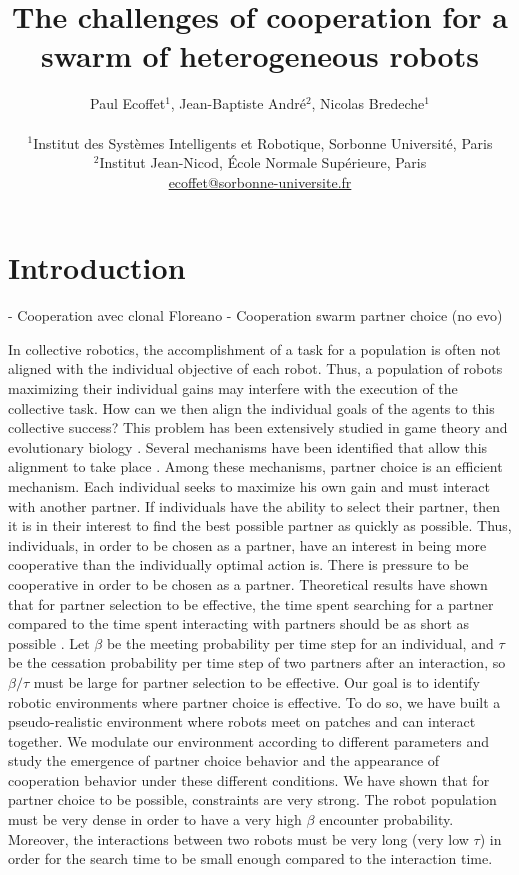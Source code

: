 \documentclass[letterpaper]{article}
\title{The challenges of cooperation for a swarm of heterogeneous robots}
\author{Paul Ecoffet$^1$, Jean-Baptiste André$^2$, Nicolas Bredeche$^1$ \\
\mbox{}\\
$^1$Institut des Systèmes Intelligents et Robotique, Sorbonne Université, Paris \\
$^2$Institut Jean-Nicod, École Normale Supérieure, Paris \\
\href{mailto:ecoffet@sorbonne-universite.fr}{ecoffet@sorbonne-universite.fr}} %
\begin{document}
\maketitle

\begin{abstract}
  
\end{abstract}

\section{Introduction}

- Cooperation avec clonal Floreano
- Cooperation swarm partner choice (no evo) \cite{Aktipis2011}


In collective robotics, the accomplishment of a task for a population is often not aligned with the individual objective of each robot. Thus, a population of robots maximizing their individual gains may interfere with the execution of the collective task. How can we then align the individual goals of the agents to this collective success? This problem has been extensively studied in game theory and evolutionary biology \citep{Axelrod1981}. Several mechanisms have been identified that allow this alignment to take place \citep{West2007a}. Among these mechanisms, partner choice is an efficient mechanism. Each individual seeks to maximize his own gain and must interact with another partner. If individuals have the ability to select their partner, then it is in their interest to find the best possible partner as quickly as possible. Thus, individuals, in order to be chosen as a partner, have an interest in being more cooperative than the individually optimal action is. There is pressure to be cooperative in order to be chosen as a partner. Theoretical results have shown that for partner selection to be effective, the time spent searching for a partner compared to the time spent interacting with partners should be as short as possible \citep{Debove2015b}. Let $\beta$ be the meeting probability per time step for an individual, and $\tau$ be the cessation probability per time step of two partners after an interaction, so $\beta / \tau$ must be large for partner selection to be effective. Our goal is to identify robotic environments where partner choice is effective. To do so, we have built a pseudo-realistic environment where robots meet on patches and can interact together. We modulate our environment according to different parameters and study the emergence of partner choice behavior and the appearance of cooperation behavior under these different conditions. We have shown that for partner choice to be possible, constraints are very strong. The robot population must be very dense in order to have a very high $\beta$ encounter probability. Moreover, the interactions between two robots must be very long (very low $\tau$) in order for the search time to be small enough compared to the interaction time.
\end{document}
